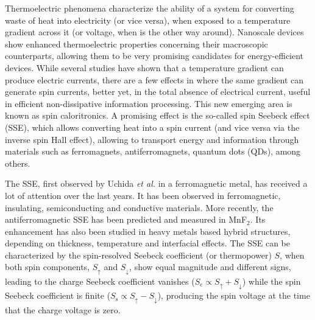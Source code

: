 \documentclass[aps,twocolumn,prb,superscript,floatfix,superscriptaddress,showpacs]{revtex4-1}
\begin{document}
Thermoelectric phenomena characterize the ability of a system for converting waste of heat into electricity (or vice versa), when exposed to a temperature gradient across it (or voltage, when is the other way around). Nanoscale devices show enhanced thermoelectric properties concerning their macroscopic counterparts, allowing them to be very promising candidates for energy-efficient devices. While several studies have shown that a temperature gradient can produce electric currents, there are a few effects in where the same gradient can generate spin currents, better yet, in the total absence of electrical current, useful in efficient non-dissipative information processing. This new emerging area is known as spin caloritronics.\cite{Bauer2010,Bauer2012Spincaloritronics} A promising effect is the so-called spin Seebeck effect (SSE), which allows converting heat into a spin current (and vice versa via the inverse spin Hall effect\cite{Saitoh2006}), allowing to transport energy and information through materials such as ferromagnets, antiferromagnets, quantum dots (QDs), among others.

The SSE, first observed by Uchida \emph{et al.}\cite{uchida2008} in a ferromagnetic metal, has received a lot of attention over the last years.\cite{Uchida2010JAP,adachi2013} It has been observed in ferromagnetic,\cite{uchida2008} insulating,\cite{Uchida2010spin} semiconducting\cite{Jaworski2010} and conductive materials. More recently, the antiferromagnetic SSE has been predicted\cite{Rezende2016} and measured\cite{Wu2016} in MnF$_{2}$. Its enhancement has also been studied in heavy metals based hybrid structures,\cite{Guo2016} depending on thickness, temperature and interfacial effects. The SSE can be characterized by the spin-resolved Seebeck coefficient (or thermopower) $S$, when both spin components, $S_{\uparrow}$ and $S_{\downarrow}$, show equal magnitude and different signs, leading to the charge Seebeck coefficient vanishes ($S_{\text{c}}\propto S_{\uparrow}+S_{\downarrow}$) while the spin Seebeck coefficient is finite ($S_{\text{s}}\propto S_{\uparrow}-S_{\downarrow}$), producing the spin voltage at the time that the charge voltage is zero.\cite{Swirkowicz2009,Czerner2011,Trocha2012,Rameshti2015}
\end{document}
